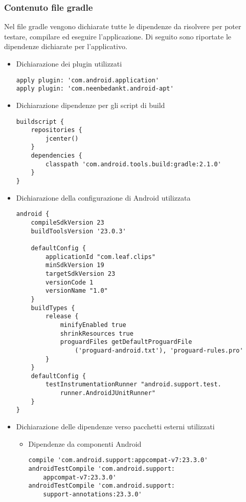 \documentclass[../ManualeSviluppatore.tex]{subfiles}
\begin{document}
		\subsubsection{Contenuto file gradle}
		Nel file gradle vengono dichiarate tutte le dipendenze da risolvere per poter testare, compilare ed eseguire l'applicazione. Di seguito sono riportate le dipendenze dichiarate per l'applicativo. 
		\begin{itemize}
			\item Dichiarazione dei plugin utilizzati
			\lstset{language=Java}
			\begin{lstlisting}
apply plugin: 'com.android.application'
apply plugin: 'com.neenbedankt.android-apt'
			\end{lstlisting}
			\item Dichiarazione dipendenze per gli script di build
			\lstset{language=Java}
			\begin{lstlisting}
buildscript {
    repositories {
        jcenter()
    }
    dependencies {
        classpath 'com.android.tools.build:gradle:2.1.0'
    }
}
			\end{lstlisting}
			\item Dichiarazione della configurazione di \gls{Android} utilizzata
			\lstset{language=Java}
			\begin{lstlisting}
android {
    compileSdkVersion 23
    buildToolsVersion '23.0.3'

    defaultConfig {
        applicationId "com.leaf.clips"
        minSdkVersion 19
        targetSdkVersion 23
        versionCode 1
        versionName "1.0"
    }
    buildTypes {
        release {
            minifyEnabled true
            shrinkResources true
            proguardFiles getDefaultProguardFile
            	('proguard-android.txt'), 'proguard-rules.pro'
        }
    }
    defaultConfig {
        testInstrumentationRunner "android.support.test.
        	runner.AndroidJUnitRunner"
    }
}

			\end{lstlisting}
			\item Dichiarazione delle dipendenze verso pacchetti esterni utilizzati
				\begin{itemize}
					\item Dipendenze da componenti \gls{Android}\ 
	
						\lstset{language=Java}
						\begin{lstlisting}
compile 'com.android.support:appcompat-v7:23.3.0'
androidTestCompile 'com.android.support:
	appcompat-v7:23.3.0'
androidTestCompile 'com.android.support:
	support-annotations:23.3.0'


\end{lstlisting}
\end{itemize}
\end{itemize}
\end{document}
